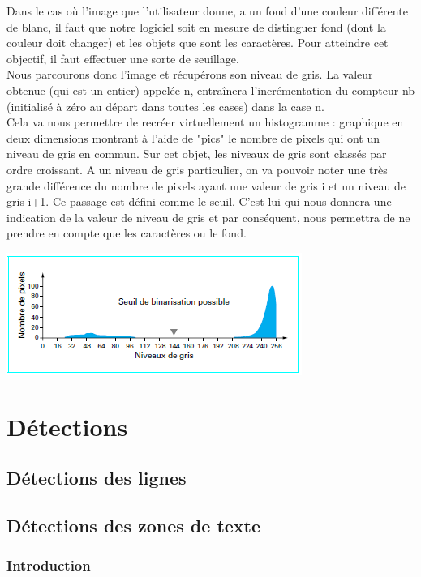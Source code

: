 \documentclass [french,12pt]{article}
\begin{document}
Dans le cas où l'image que l'utilisateur donne, a un fond d'une couleur différente de blanc, il faut que notre logiciel soit en mesure de distinguer fond (dont la couleur doit changer) et les objets que sont les caractères. 
Pour atteindre cet objectif, il faut effectuer une sorte de seuillage. \\
Nous parcourons donc l'image et récupérons son niveau de gris. La valeur obtenue (qui est un entier) appelée n, entraînera l'incrémentation du compteur nb (initialisé à zéro au départ dans toutes les cases) dans la case n. \\
Cela va nous permettre de recréer virtuellement un histogramme : graphique en deux dimensions montrant à l'aide de "pics" le nombre de pixels qui ont un niveau de gris en commun. Sur cet objet, les niveaux de gris sont classés par ordre croissant.  A un niveau de gris particulier, on va pouvoir noter une très grande différence du nombre de pixels ayant une valeur de gris i et un niveau de gris i+1. Ce passage est défini comme le seuil. C'est lui qui nous donnera une indication de la valeur de niveau de gris et par conséquent, nous permettra de ne prendre en compte que les caractères ou le fond.\\

\begin{center} \includegraphics[scale=1.50]{seuil} \end{center}

\newpage

\section{Détections}
\subsection{Détections des lignes}
\subsection{Détections des zones de texte}
\subsubsection{Introduction}
\end{document}

